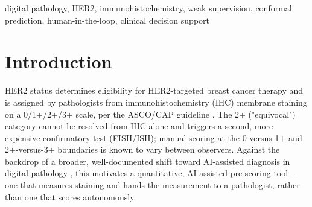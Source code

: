 \documentclass[conference]{IEEEtran}
\begin{document}
\begin{abstract}
Manual HER2 immunohistochemistry (IHC) scoring is subjective at its class
boundaries, and the equivocal 2+ category triggers a second, costly
confirmatory test. We present BioMarkHER2, an end-to-end AI-assisted
\emph{measurement} system for HER2 IHC intensity, built under two hard
constraints: no real whole-slide-image data yet exists for the clinical
site this project targets (84 slides, not digitized), and the development
machine is CPU-only. The system comprises classical stain-based
preprocessing, a weakly-supervised segmentation model trained without any
pixel-level annotation, an evaluation framework combining conformal
prediction, cross-group stain-variation analysis and offline ASCO/CAP
mapping, and a local review-viewer web application through which a
pathologist inspects the model's output beside a classical control and
records a confirmed score. The system's central design principle --
assistive, never autonomous -- is formalized as a strict functional
boundary between measurement and diagnosis and enforced as executable
tests, not only as documentation: no API response or UI anywhere is
permitted to carry a field named \texttt{score}, \texttt{her2\_score},
\texttt{verdict} or \texttt{diagnosis}, checked on every test run. We
report results across the full pipeline, an honest coverage accounting
against the project's original nine-item brief, a validity-threat analysis
organized by the standard construct/internal/external/statistical
taxonomy, and the items that remain genuinely blocked on data no
engineering effort can substitute for, rather than on missing code.
\end{abstract}

\begin{IEEEkeywords}
digital pathology, HER2, immunohistochemistry, weak supervision, conformal
prediction, human-in-the-loop, clinical decision support
\end{IEEEkeywords}

\section{Introduction}

HER2 status determines eligibility for HER2-targeted breast cancer therapy
and is assigned by pathologists from immunohistochemistry (IHC) membrane
staining on a 0/1+/2+/3+ scale, per the ASCO/CAP guideline
\cite{wolff2018}. The 2+ ("equivocal") category cannot be resolved from
IHC alone and triggers a second, more expensive confirmatory test
(FISH/ISH); manual scoring at the 0-versus-1+ and 2+-versus-3+ boundaries
is known to vary between observers. Against the backdrop of a broader,
well-documented shift toward AI-assisted diagnosis in digital pathology
\cite{bera2019}, this motivates a quantitative, AI-assisted pre-scoring
tool -- one that measures staining and hands the measurement to a
pathologist, rather than one that scores autonomously.
\end{document}
